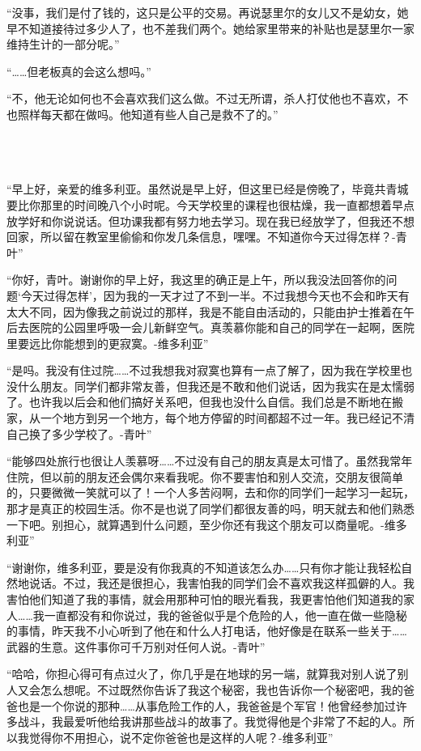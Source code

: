“没事，我们是付了钱的，这只是公平的交易。再说瑟里尔的女儿又不是幼女，她早不知道接待过多少人了，也不差我们两个。她给家里带来的补贴也是瑟里尔一家维持生计的一部分呢。”

“……但老板真的会这么想吗。”

“不，他无论如何也不会喜欢我们这么做。不过无所谓，杀人打仗他也不喜欢，不也照样每天都在做吗。他知道有些人自己是救不了的。”

 \section*{}

“早上好，亲爱的维多利亚。虽然说是早上好，但这里已经是傍晚了，毕竟共青城要比你那里的时间晚八个小时呢。今天学校里的课程也很枯燥，我一直都想着早点放学好和你说说话。但功课我都有努力地去学习。现在我已经放学了，但我还不想回家，所以留在教室里偷偷和你发几条信息，嘿嘿。不知道你今天过得怎样？-青叶”

“你好，青叶。谢谢你的早上好，我这里的确正是上午，所以我没法回答你的问题‘今天过得怎样’，因为我的一天才过了不到一半。不过我想今天也不会和昨天有太大不同，因为像我之前说过的那样，我是不能自由活动的，只能由护士推着在午后去医院的公园里呼吸一会儿新鲜空气。真羡慕你能和自己的同学在一起啊，医院里要远比你能想到的更寂寞。-维多利亚”

“是吗。我没有住过院……不过我想我对寂寞也算有一点了解了，因为我在学校里也没什么朋友。同学们都非常友善，但我还是不敢和他们说话，因为我实在是太懦弱了。也许我以后会和他们搞好关系吧，但我也没什么自信。我们总是不断地在搬家，从一个地方到另一个地方，每个地方停留的时间都超不过一年。我已经记不清自己换了多少学校了。-青叶”

“能够四处旅行也很让人羡慕呀……不过没有自己的朋友真是太可惜了。虽然我常年住院，但以前的朋友还会偶尔来看我呢。你不要害怕和别人交流，交朋友很简单的，只要微微一笑就可以了！一个人多苦闷啊，去和你的同学们一起学习一起玩，那才是真正的校园生活。你不是也说了同学们都很友善的吗，明天就去和他们熟悉一下吧。别担心，就算遇到什么问题，至少你还有我这个朋友可以商量呢。-维多利亚”

“谢谢你，维多利亚，要是没有你我真的不知道该怎么办……只有你才能让我轻松自然地说话。不过，我还是很担心，我害怕我的同学们会不喜欢我这样孤僻的人。我害怕他们知道了我的事情，就会用那种可怕的眼光看我，我更害怕他们知道我的家人……我一直都没有和你说过，我的爸爸似乎是个危险的人，他一直在做一些隐秘的事情，昨天我不小心听到了他在和什么人打电话，他好像是在联系一些关于……武器的生意。这件事你可千万别对任何人说。-青叶”

“哈哈，你担心得可有点过火了，你几乎是在地球的另一端，就算我对别人说了别人又会怎么想呢。不过既然你告诉了我这个秘密，我也告诉你一个秘密吧，我的爸爸也是一个你说的那种……从事危险工作的人，我爸爸是个军官！他曾经参加过许多战斗，我最爱听他给我讲那些战斗的故事了。我觉得他是个非常了不起的人。所以我觉得你不用担心，说不定你爸爸也是这样的人呢？-维多利亚”


